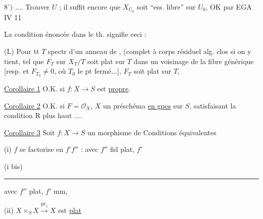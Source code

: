 
$8^\circ)$ .... Trouver $U$ ; il suffit encore que $X_{U_0}$ soit ``ess. libre'' sur $U_0$, OK par EGA IV 11

La condition énoncée dans le th. signifie ceci :

(L) Pour tt $T$ spectr d'un anneau de , (complet à corps résiduel alg. clos si on y tient,  tel que $F_T$ sur $X_T/T$ soit plat sur $T$ dans un voisinage de la fibre générique [resp. et $F_{T_0}\ne0$, où $T_0$ le pt fermé...],  $F_T$ soit plat sur $T$, 


\uline{Corollaire 1} O.K. si $f:X\to S$ est \uline{propre}.

\uline{Corollaire 2} O.K. si  $F=\mathcal O_X$, $X$ un préschéma \uline{en gpes} sur $S$, satisfaisant la condition R plus haut ....

\uline{Corollaire 3} Soit $f:X\to S$ un morphisme de  Conditions équivalentes

(i) $f$ se factorise en $f'f''$ :  avec $f''$ fid plat, $f'$ 

(i bis) \rule{4cm}{0.3pt} avec $f''$ plat, $f'$ mm,

(ii)   $X\times_S X\xrightarrow{\mathrm{pr}_1}X$ est \uline{plat}

